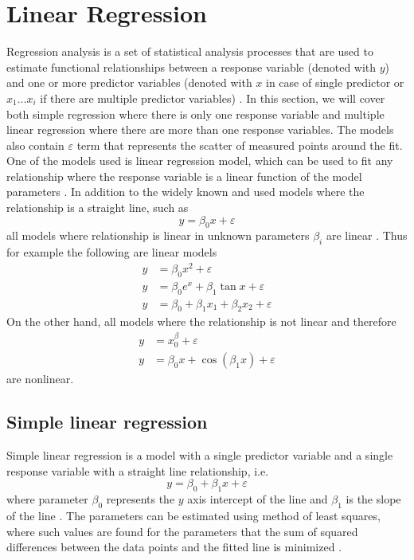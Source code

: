 \documentclass[english, oneside]{HYgradu}
\begin{document}
\section{Linear Regression}
Regression analysis is a set of statistical analysis processes that are used to estimate functional relationships between a response variable (denoted with $y$) and one or more predictor variables (denoted with $x$ in case of single predictor or $x_1 \dots x_i$ if there are multiple predictor variables) \citep{feigelson2012modern}. In this section, we will cover both simple regression where there is only one response variable and multiple linear regression where there are more than one response variables. The models also contain $\varepsilon$ term that represents the scatter of measured points around the fit. One of the models used is linear regression model, which can be used to fit any relationship where the response variable is a linear function of the model parameters \citep{montgomery2012introduction}. In addition to the widely known and used models where the relationship is a straight line, such as
\begin{equation}
	y = \beta_0 x + \varepsilon
\end{equation}
all models where relationship is linear in unknown parameters $\beta_i$ are linear \citep{montgomery2012introduction}. Thus for example the following are linear models
\begin{align}
	y &= \beta_0 x^2 + \varepsilon \\
	y &= \beta_0 e^x + \beta_1 \tan{x} + \varepsilon \\
	y &= \beta_0 + \beta_1 x_1 + \beta_2 x_2 + \varepsilon
\end{align}
On the other hand, all models where the relationship is not linear and therefore
\begin{align}
	y &= x^\beta_0 + \varepsilon \\
	y &= \beta_0 x + \cos{(\beta_1 x)} + \varepsilon
\end{align}
are nonlinear.


\subsection{Simple linear regression}
\reversemarginpar
{}
Simple linear regression is a model with a single predictor variable and a single response variable with a straight line relationship, i.e.
\begin{equation}
	y = \beta_0 + \beta_1 x + \varepsilon
\end{equation}
where parameter $\beta_0$ represents the $y$ axis intercept of the line and $\beta_1$ is the slope of the line \citep{montgomery2012introduction}. The parameters can be estimated using method of least squares, where such values are found for the parameters that the sum of squared differences between the data points and the fitted line is minimized \citep{montgomery2012introduction}. 
\end{document}
